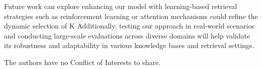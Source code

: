 \documentclass[Afour,sageh,times]{sagej}
\begin{document}
Future work can explore enhancing our model with learning-based retrieval strategies such as reinforcement learning or attention mechanisms could refine the dynamic selection of K Additionally, testing our approach in real-world scenarios and conducting large-scale evaluations across diverse domains will help validate its robustness and adaptability in various knowledge bases and retrieval settings.
\begin{dci}
The authors have no Conflict of Interests to share.
\end{dci}

%


%
%
%
%
%
%
%
%
\end{document}
